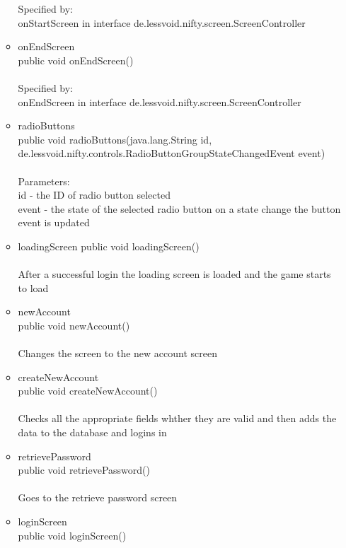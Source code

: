 \documentclass[letterpaper]{article}
\begin{document}
\begin{itemize}
\begin{itemize}
														Specified by: \\
														onStartScreen in interface de.lessvoid.nifty.screen.ScreenController
												\item	onEndScreen \\
														public void onEndScreen() \\ \\
														Specified by: \\
														onEndScreen in interface de.lessvoid.nifty.screen.ScreenController
												\item	radioButtons \\
														public void radioButtons(java.lang.String id, de.lessvoid.nifty.controls.RadioButtonGroupStateChangedEvent event) \\ \\
														Parameters: \\
														id - the ID of radio button selected \\
														event - the state of the selected radio button on a state change the button event is updated
												\item	loadingScreen
														public void loadingScreen() \\ \\
														After a successful login the loading screen is loaded and the game starts to load
												\item	newAccount \\
														public void newAccount() \\ \\
														Changes the screen to the new account screen
												\item	createNewAccount \\
														public void createNewAccount() \\ \\
														Checks all the appropriate fields whther they are valid and then adds the data to the database and logins in
												\item	retrievePassword \\
														public void retrievePassword() \\ \\
														Goes to the retrieve password screen
												\item	loginScreen \\
														public void loginScreen() \\

\end{itemize}
\end{itemize}
\end{document}
